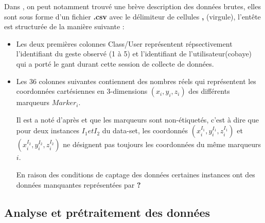 \par 
Dans \cite{dataset}, on peut notamment trouvé une brève description des données brutes, elles sont sous forme d'un fichier \textbf{.csv} avec le délimiteur de cellules \textbf{,} (virgule), l'entête est structurée  de la manière suivante :
\begin{itemize}
	\item Les deux premières colonnes Class/User représentent répsectivement l'identifiant du geste observé (1 à 5) et l'identifiant de l'utilisateur(cobaye) qui a porté le gant durant cette session de collecte de données.
	\item Les 36 colonnes suivantes contiennent des nombres réels qui représentent les coordonnées cartésiennes en 3-dimensions $(x_i,y_i,z_i)$ des différents marqueurs $Marker_i$. \par Il est a noté d'après \cite{datasetDetails} et \cite{dataset} que les marqueurs sont non-étiquetés, c'est à dire que pour deux instances $I_1 et I_2$ du data-set, les coordonnés $(x_i^{I_1},y_i^{I_1},z_i^{I_1})$ et $(x_i^{I_2},y_i^{I_2},z_i^{I_2})$ ne désignent pas toujours les coordonnées du même marqueurs $i$. \par En raison des conditions de captage des données certaines instances ont des données manquantes représentées par \textbf{?}
\end{itemize}
\subsection{Analyse et prétraitement des données}
